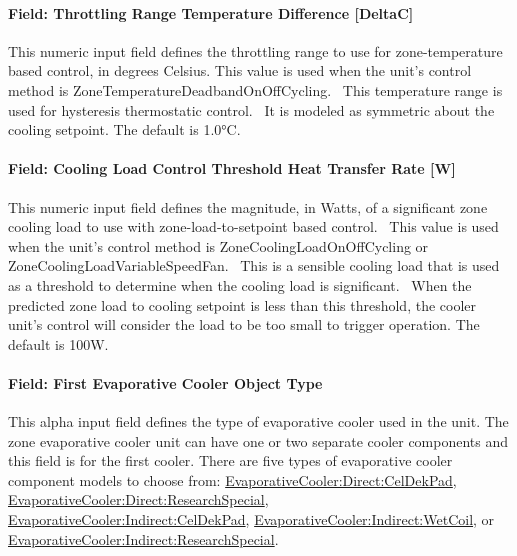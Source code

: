 \paragraph{Field: Throttling Range Temperature Difference {[}DeltaC{]}}\label{field-throttling-range-temperature-difference-deltac}

This numeric input field defines the throttling range to use for zone-temperature based control, in degrees Celsius. This value is used when the unit's control method is ZoneTemperatureDeadbandOnOffCycling.~ This temperature range is used for hysteresis thermostatic control.~ It is modeled as symmetric about the cooling setpoint. The default is 1.0°C.

\paragraph{Field: Cooling Load Control Threshold Heat Transfer Rate {[}W{]}}\label{field-cooling-load-control-threshold-heat-transfer-rate-w}

This numeric input field defines the magnitude, in Watts, of a significant zone cooling load to use with zone-load-to-setpoint based control.~ This value is used when the unit's control method is ZoneCoolingLoadOnOffCycling or ZoneCoolingLoadVariableSpeedFan.~ This is a sensible cooling load that is used as a threshold to determine when the cooling load is significant.~ When the predicted zone load to cooling setpoint is less than this threshold, the cooler unit's control will consider the load to be too small to trigger operation. The default is 100W.

\paragraph{Field: First Evaporative Cooler Object Type}\label{field-first-evaporative-cooler-object-type}

This alpha input field defines the type of evaporative cooler used in the unit. The zone evaporative cooler unit can have one or two separate cooler components and this field is for the first cooler. There are five types of evaporative cooler component models to choose from: \hyperref[evaporativecoolerdirectceldekpad]{EvaporativeCooler:Direct:CelDekPad}, \hyperref[evaporativecoolerdirectresearchspecial]{EvaporativeCooler:Direct:ResearchSpecial}, \hyperref[evaporativecoolerindirectceldekpad]{EvaporativeCooler:Indirect:CelDekPad}, \hyperref[evaporativecoolerindirectwetcoil]{EvaporativeCooler:Indirect:WetCoil}, or \hyperref[evaporativecoolerindirectresearchspecial]{EvaporativeCooler:Indirect:ResearchSpecial}.

